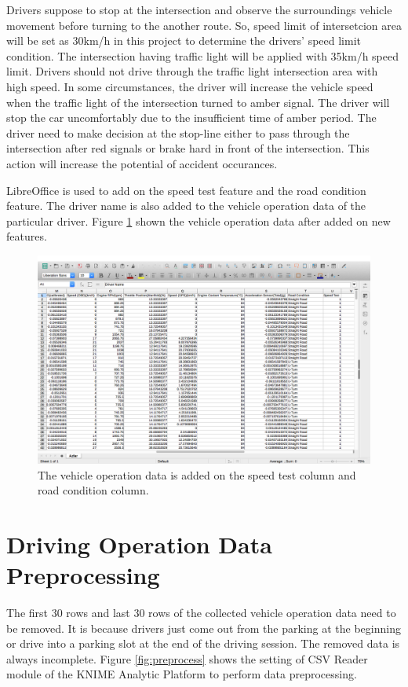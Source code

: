 Drivers suppose to stop at the intersection and observe the surroundings vehicle movement before turning to the another route. So, speed limit of intersetcion area will be set as 30km/h in this project to determine the drivers' speed limit condition. The intersection having traffic light will be applied with 35km/h speed limit. Drivers should not drive through the traffic light intersection area with high speed. In some circumstances, the driver will increase the vehicle speed when the traffic light of the intersection turned to amber signal. The driver will stop the car uncomfortably due to the insufficient time of amber period. The driver need to make decision at the stop-line either to pass through the intersection after red signals or brake hard in front of the intersection. This action will increase the potential of accident occurances.\cite{kulanthayan:phang:hayati:2007}

LibreOffice is used to add on the speed test feature and the road condition feature. The driver name is also added to the vehicle operation data of the particular driver. Figure \ref{fig:speedtest} shown the vehicle operation data after added on new features.

\begin{figure}[hbt!]\centering
\includegraphics[width=.75\textwidth]{image/LOspeedtest}
\caption{The vehicle operation data is added on the speed test column and road condition column.}
\label{fig:speedtest}
\end{figure}


\section{Driving Operation Data Preprocessing}
The first 30 rows and last 30 rows of the collected vehicle operation data need to be removed. It is because drivers just come out from the parking at the beginning or drive into a parking slot at the end of the driving session. The removed data is always incomplete. Figure \ref{fig:preprocess} shows the setting of CSV Reader module of the KNIME Analytic Platform to perform data preprocessing.

